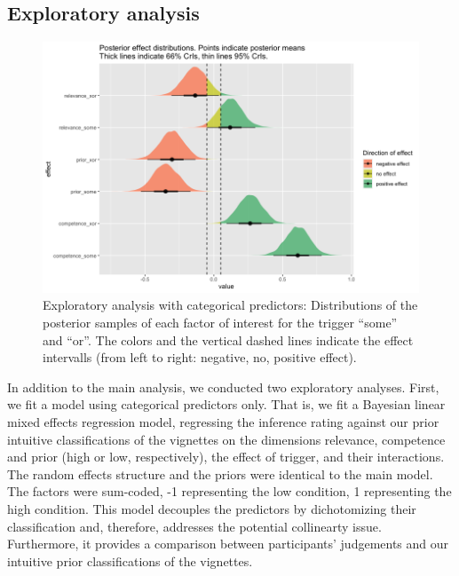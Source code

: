 \documentclass{sp}
\begin{document}
\subsection{Exploratory analysis}
\begin{figure}[t]
	\begin{center}
		\includegraphics[width=1\linewidth]{images/posterior-effects-categorical.png}
	\end{center}
	\vspace{-0.3cm}
	\caption{Exploratory analysis with categorical predictors: Distributions of the posterior samples of each factor of interest for the trigger ``some'' and ``or''. The colors and the vertical dashed lines indicate the effect intervalls (from left to right: negative, no, positive effect).}
	\label{posteriors-cat}
\end{figure}
In addition to the main analysis, we conducted two exploratory analyses. First, we fit a model using categorical predictors only. That is, we fit a Bayesian linear mixed effects regression model, regressing the inference rating against our prior intuitive classifications of the vignettes on the dimensions relevance, competence and prior (high or low, respectively), the effect of trigger, and their interactions. The random effects structure and the priors were identical to the main model. The factors were sum-coded, -1 representing the low condition, 1 representing the high condition. 
This model decouples the predictors by dichotomizing their classification and, therefore, addresses the potential collinearty issue. Furthermore, it provides a comparison between participants' judgements and our intuitive prior classifications of the vignettes. 
\end{document}
